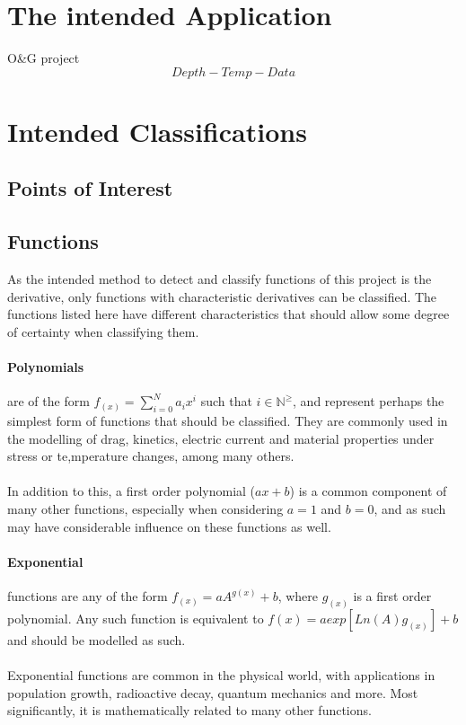 \documentclass[main.tex]{subfiles}
\begin{document}
    
  \section{The intended Application}
    
    O\&G project
    \[Depth-Temp-Data\]
    
  \section{Intended Classifications}
    
    \subsection{Points of Interest}  
      
    \subsection{Functions}
      
      As the intended method to detect and classify functions of this project is the derivative, only functions with characteristic derivatives can be classified. The functions listed here have different characteristics that should allow some degree of certainty when classifying them.
      \paragraph{Polynomials} are of the form $f_{(x)}=\sum_{i=0}^{N} a_i x^i$ such that $i \in \mathbb{N}^\geq$, and represent perhaps the simplest form of functions that should be classified. They are commonly used in the modelling of drag, kinetics, electric current and material properties under stress or te,mperature changes, among many others. 
      \\\\
      In addition to this, a first order polynomial ($a x + b$) is a common component of many other functions, especially when considering $a=1$ and $b=0$, and as such may have considerable influence on these functions as well.
      \paragraph{Exponential} functions are any of the form $f_{(x)}= a A^{g(x)} + b$, where $g_{(x)}$ is a first order polynomial. Any such function is equivalent to $ f{(x)} =  a exp[  Ln(A) g_{(x)}  ] +b $ and should be modelled as such. 
      \\\\
      Exponential functions are common in the physical world, with applications in population growth, radioactive decay, quantum mechanics and more. Most significantly, it is mathematically related to many other functions.
\end{document}

